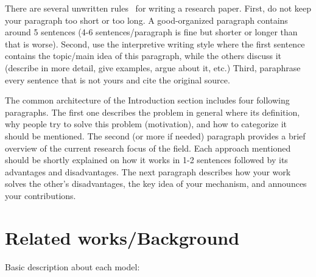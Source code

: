 \documentclass[11pt]{article}
\begin{document}
There are several unwritten rules~\citep{strunk2000elements} for writing a research paper. 
First, do not keep your paragraph too short or too long. 
A good-organized paragraph contains around 5 sentences (4-6 sentences/paragraph is fine but shorter or longer than that is worse).
Second, use the interpretive writing style where the first sentence contains the topic/main idea of this paragraph, while the others discuss it (describe in more detail, give examples, argue about it, etc.)
Third, paraphrase every sentence that is not yours and cite the original source.

The common architecture of the Introduction section includes four following paragraphs.
The first one describes the problem in general where its definition, why people try to solve this problem (motivation), and how to categorize it should be mentioned.
The second (or more if needed) paragraph provides a brief overview of the current research focus of the field.
Each approach mentioned should be shortly explained on how it works in 1-2 sentences followed by its advantages and disadvantages.
The next paragraph describes how your work solves the other's disadvantages, the key idea of your mechanism, and announces your contributions.

\section{Related works/Background}
Basic description about each model:
\end{document}
